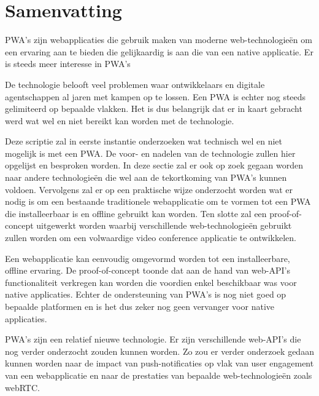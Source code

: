 





\chapter*{Samenvatting}

PWA's zijn webapplicaties die gebruik maken van moderne web-technologieën om een ervaring aan te bieden die gelijkaardig is aan die van een native applicatie. Er is steeds meer interesse in PWA's \autocite{googleTrends2020}

De technologie belooft veel problemen waar ontwikkelaars en digitale agentschappen al jaren met kampen op te lossen.  Een PWA is echter nog steeds gelimiteerd op bepaalde vlakken. 
Het is dus belangrijk dat er in kaart gebracht werd wat wel en niet bereikt kan worden met de technologie.

Deze scriptie zal in eerste instantie onderzoeken wat technisch wel en niet mogelijk is met een PWA. De voor- en nadelen van de technologie zullen hier opgelijst en besproken worden.
In deze sectie zal er ook op zoek gegaan worden naar andere technologieën die wel aan de tekortkoming van PWA's kunnen voldoen.
Vervolgens zal er op een praktische wijze onderzocht worden wat er nodig is om een bestaande traditionele webapplicatie om te vormen tot een PWA die installeerbaar is en offline gebruikt kan worden.
Ten slotte zal een proof-of-concept uitgewerkt worden waarbij verschillende web-technologieën gebruikt zullen worden om een volwaardige video conference applicatie te ontwikkelen. 

Een webapplicatie kan eenvoudig omgevormd worden tot een installeerbare, offline ervaring. De proof-of-concept toonde dat aan de hand van web-API's functionaliteit verkregen kan worden die voordien enkel beschikbaar was voor native applicaties.
Echter de ondersteuning van PWA's is nog niet goed op bepaalde platformen en is het dus zeker nog geen vervanger voor native applicaties.

PWA's zijn een relatief nieuwe technologie. Er zijn verschillende web-API's die nog verder onderzocht zouden kunnen worden. Zo zou er verder onderzoek gedaan kunnen worden naar de impact van push-notificaties op vlak van user engagement van een webapplicatie en naar de prestaties van bepaalde web-technologieën zoals webRTC.
